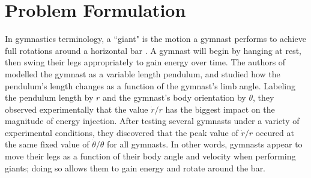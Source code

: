 \documentclass[journal,twoside,web]{ieeecolor}
\begin{document}
\section{Problem Formulation}\label{sec:problem-formulation}
%

In gymnastics terminology, a ``giant" is the motion a gymnast performs to
achieve full rotations around a horizontal bar \cite{usagym_giant}. 
A gymnast will begin by hanging at rest, then swing their legs
appropriately to gain energy over time.
The authors of \cite{pendulum_length_giant_gymnastics} modelled the gymnast as a
variable length pendulum, and studied how the pendulum's length changes as a
function of the gymnast's limb angle.
Labeling the pendulum length by \(r\) and the gymnast's body orientation
by \(\theta\), they observed experimentally that the value \(\dot{r}/r\) has
the biggest impact on the magnitude of energy injection. 
After testing several gymnasts under a variety of experimental conditions, 
they discovered that the peak value of \(\dot{r}/r\) occured at the same fixed
value of \(\dot{\theta}/\theta\) for all gymnasts.
In other words, gymnasts appear to move their legs as a function of their body
angle and velocity when performing giants; 
doing so allows them to gain energy and rotate around the bar.
\end{document}

